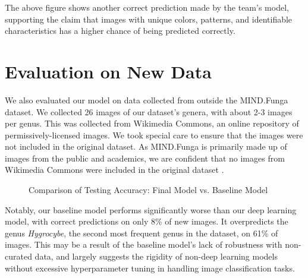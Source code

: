 \documentclass{article} %
\begin{document}
The above figure shows another correct prediction made by the team’s model, supporting the claim that images with unique colors, patterns, and identifiable characteristics has a higher chance of being predicted correctly.

\section{Evaluation on New Data}
\label{sec:evaluation}
We also evaluated our model on data collected from outside the MIND.Funga dataset. We collected 26 images of our dataset's genera, with about 2-3 images per genus. This was collected from Wikimedia Commons, an online repository of permissively-licensed images. We took special care to ensure that the images were not included in the original dataset. As MIND.Funga is primarily made up of images from the public and academics, we are confident that no images from Wikimedia Commons were included in the original dataset \citep{Drechsler-SantosKarstedtEtAl.MINDFunga.2023}.

\begin{figure}[h]
    \centering
    \caption{Comparison of Testing Accuracy: Final Model vs. Baseline Model}
    \label{fig:testingAccuracyComparison}
\end{figure}

Notably, our baseline model performs significantly worse than our deep learning model, with correct predictions on only 8\% of new images. It overpredicts the genus \textit{Hygrocybe}, the second most frequent genus in the dataset, on 61\% of images. This may be a result of the baseline model's lack of robustness with non-curated data, and largely suggests the rigidity of non-deep learning models without excessive hyperparameter tuning in handling image classification tasks.
\end{document}
